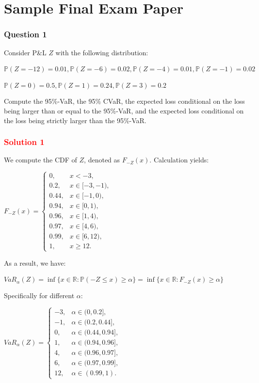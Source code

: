 \section{Sample Final Exam Paper}

\subsubsection*{Question 1}

Consider P\&L $Z$ with the following distribution:

\centerline{$\mathbb{P}(Z=-12)=0.01, \mathbb{P}(Z=-6)=0.02, \mathbb{P}(Z=-4)=0.01,\mathbb{P}(Z=-1)=0.02$}

\centerline{$\mathbb{P}(Z=0)=0.5, \mathbb{P}(Z=1)=0.24,\mathbb{P}(Z=3)=0.2$}


Compute the 95\%-VaR, the 95\% CVaR, the expected loss conditional on the loss being larger than or equal to the 95\%-VaR, and the expected loss conditional on the loss being strictly larger than the 95\%-VaR.

\subsubsection*{\textcolor{red}{Solution 1}}

We compute the CDF of $Z$, denoted as $F_{-Z}(x)$. Calculation yields:

\centerline{$F_{-Z}(x) = \begin{cases} 0, & x < -3, \\ 0.2, & x \in [-3, -1), \\ 0.44, & x \in [-1, 0), \\ 0.94, & x \in [0, 1), \\ 0.96, & x \in [1, 4), \\ 0.97, & x \in [4, 6), \\ 0.99, & x \in [6, 12), \\ 1, & x \ge 12. \end{cases}$}

As a result, we have:

\centerline{$VaR_{\alpha}(Z) = \inf\{x \in \mathbb{R} : \mathbb{P}(-Z \le x) \ge \alpha\} = \inf\{x \in \mathbb{R} : F_{-Z}(x) \ge \alpha\}$}

Specifically for different $\alpha$:

\centerline{$VaR_{\alpha}(Z) = \begin{cases} -3, & \alpha \in (0, 0.2], \\ -1, & \alpha \in (0.2, 0.44], \\ 0, & \alpha \in (0.44, 0.94], \\ 1, & \alpha \in (0.94, 0.96], \\ 4, & \alpha \in (0.96, 0.97], \\ 6, & \alpha \in (0.97, 0.99], \\ 12, & \alpha \in (0.99, 1). \end{cases}$}


